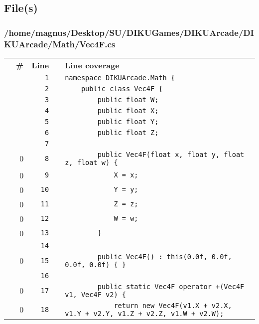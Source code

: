 \documentclass[a4paper,landscape,10pt]{article}
\begin{document}
\subsection{File(s)}
\subsubsection{/home/magnus/Desktop/SU/DIKUGames/DIKUArcade/DIKUArcade/Math/Vec4F.cs}
\begin{longtable}[l]{lrrll}
\textbf{} & \textbf{\#} & \textbf{Line} & \textbf{} & \textbf{Line coverage}\\
\cellcolor{gray} &  & \verb~1~ & & \verb~namespace DIKUArcade.Math {~\\
\cellcolor{gray} &  & \verb~2~ & & \verb~    public class Vec4F {~\\
\cellcolor{gray} &  & \verb~3~ & & \verb~        public float W;~\\
\cellcolor{gray} &  & \verb~4~ & & \verb~        public float X;~\\
\cellcolor{gray} &  & \verb~5~ & & \verb~        public float Y;~\\
\cellcolor{gray} &  & \verb~6~ & & \verb~        public float Z;~\\
\cellcolor{gray} &  & \verb~7~ & & \verb~~\\
\cellcolor{red} & 0 & \verb~8~ & & \verb~        public Vec4F(float x, float y, float z, float w) {~\\
\cellcolor{red} & 0 & \verb~9~ & & \verb~            X = x;~\\
\cellcolor{red} & 0 & \verb~10~ & & \verb~            Y = y;~\\
\cellcolor{red} & 0 & \verb~11~ & & \verb~            Z = z;~\\
\cellcolor{red} & 0 & \verb~12~ & & \verb~            W = w;~\\
\cellcolor{red} & 0 & \verb~13~ & & \verb~        }~\\
\cellcolor{gray} &  & \verb~14~ & & \verb~~\\
\cellcolor{red} & 0 & \verb~15~ & & \verb~        public Vec4F() : this(0.0f, 0.0f, 0.0f, 0.0f) { }~\\
\cellcolor{gray} &  & \verb~16~ & & \verb~~\\
\cellcolor{red} & 0 & \verb~17~ & & \verb~        public static Vec4F operator +(Vec4F v1, Vec4F v2) {~\\
\cellcolor{red} & 0 & \verb~18~ & & \verb~            return new Vec4F(v1.X + v2.X, v1.Y + v2.Y, v1.Z + v2.Z, v1.W + v2.W);~\\

\end{longtable}
\end{document}

